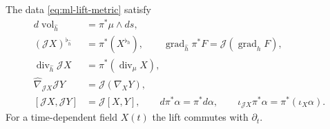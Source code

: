 \begin{proposition}
\label{prop:ml-circle-first}
The data \eqref{eq:ml-lift-metric} satisfy
\begin{align}
 d\operatorname{vol}_{\widehat h}&=\pi^*\mu\wedge ds,
                                                        \label{eq:ml-lift-vol}\\
 (\mathcal JX)^{\flat_{\widehat h}}&=\pi^*(X^{\flat_h}),
 \qquad\operatorname{grad}_{\widehat h}\pi^*F
        =\mathcal J(\operatorname{grad}_hF),             \label{eq:ml-lift-dual}\\
 \operatorname{div}_{\widehat h}\mathcal JX
        &=\pi^*(\operatorname{div}_\mu X),              \label{eq:ml-lift-div}\\
 \widehat\nabla_{\mathcal JX}\mathcal JY
        &=\mathcal J(\nabla_XY),                       \label{eq:ml-lift-connection}\\
 [\mathcal JX,\mathcal JY]&=\mathcal J[X,Y],\qquad
 d\pi^*\alpha=\pi^*d\alpha,\qquad
 \iota_{\mathcal JX}\pi^*\alpha=\pi^*(\iota_X\alpha).
                                                        \label{eq:ml-pullback}
\end{align}
For a time-dependent field $X(t)$ the lift commutes with $\partial_t$.
\end{proposition}
